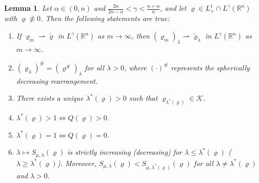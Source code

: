 \documentclass[reqno,11pt]{amsart}
\numberwithin{equation}{section}
\newtheorem{lemma}[theorem]{Lemma}
\theoremstyle{definition}
\begin{document}
\begin{lemma}\label{facts}
 Let $\alpha \in (0,n)$ and $\frac{2n}{2n - \alpha} < \gamma < \frac{n + \alpha}{n}$, 
 and let $\varrho \in L^1_+ \cap L^\gamma (\mathbb{R}^n)$ with $\varrho \not\equiv 0$. 
 Then the following statements are true{\rm :}
    \begin{enumerate}
 \item[{\rm(a)}] If $\varrho_m \rightharpoonup \tilde{\varrho}$ in $L^\gamma(\mathbb{R}^n)$ as $m \to \infty$, then $(\varrho_m)_\lambda \rightharpoonup \tilde{\varrho}_\lambda$ in $L^\gamma(\mathbb{R}^n)$ as $m \to \infty$.
\item[{\rm(b)}] $(\varrho_\lambda)^\# = (\varrho^\#)_\lambda$ for all $\lambda > 0$, where $(\cdot)^\#$ represents the spherically decreasing rearrangement.
 \item[{\rm(c)}] There exists a unique $\lambda^*(\varrho) > 0$ such that $\varrho_{\lambda^*(\varrho)} \in \mathcal{K}$.
 \item[{\rm(d)}] $\lambda^*(\varrho) > 1 \iff Q(\varrho) > 0$.
 \item[{\rm(e)}] $\lambda^*(\varrho) = 1 \iff Q(\varrho) = 0$.
 \item[{\rm(f)}] $\lambda \mapsto S_{\mu,\lambda}(\varrho)$ is strictly increasing {\rm(}decreasing{\rm)} for $\lambda \leq \lambda^*(\varrho)$ {\rm(}$\lambda \geq \lambda^*(\varrho)${\rm)}. Moreover, $S_{\mu,\lambda}(\varrho) < S_{\mu,\lambda^*(\varrho)}(\varrho)$ for all $\lambda \neq \lambda^*(\varrho)$ and $\lambda > 0$.
    \end{enumerate}
\end{lemma}
\end{document}
